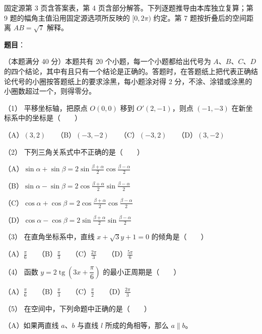 

\begin{gktip}
固定源第 3 页含答案表，第 4 页含部分解答。下列逐题推导由本库独立复算；第 9 题的幅角主值沿用固定源选项所反映的 $[0,2\pi)$ 约定。第 7 题按折叠后的空间距离 $AB=\sqrt7$ 解释。
\end{gktip}

\begin{answer}

\textbf{题目}：

（本题满分 40 分）本题共有 20 个小题，每一个小题都给出代号为 $A\text{、}B\text{、}C\text{、}D$ 的四个结论，其中有且只有一个结论是正确的。答题时，在答题纸上把代表正确结论代号的小圈按答题纸上的要求涂黑，每小题涂对得 2 分，不涂、涂错或涂黑的小圈数超过一个，则得零分。

（1） 平移坐标轴，把原点 $O(0,0)$ 移到 $O'(2,-1)$，则点 $(-1,-3)$ 在新坐标系中的坐标是\mbox{（　　）}

（A）$(3,2)$　　（B）$(-3,-2)$　　（C）$(-3,2)$　　（D）$(3,-2)$

（2） 下列三角关系式中不正确的是\mbox{（　　）}

（A）$\sin\alpha+\sin\beta=2\sin\frac{\beta+\alpha}{2}\cos\frac{\beta-\alpha}{2}$

（B）$\sin\alpha-\sin\beta=2\cos\frac{\beta+\alpha}{2}\sin\frac{\beta-\alpha}{2}$

（C）$\cos\alpha+\cos\beta=2\cos\frac{\beta+\alpha}{2}\cos\frac{\beta-\alpha}{2}$

（D）$\cos\alpha-\cos\beta=2\sin\frac{\beta+\alpha}{2}\sin\frac{\beta-\alpha}{2}$

（3） 在直角坐标系中，直线 $x+\sqrt3y+1=0$ 的倾角是\mbox{（　　）}

（A）$\frac\pi6$　　（B）$\frac\pi3$　　（C）$\frac{2\pi}3$　　（D）$\frac{5\pi}6$

（4） 函数 $y=2\operatorname{tg}\left(3x+\dfrac\pi6\right)$ 的最小正周期是\mbox{（　　）}

（A）$\frac\pi6$　　（B）$\frac\pi3$　　（C）$\frac\pi2$　　（D）$\frac{2\pi}3$

（5） 在空间中，下列命题中正确的是\mbox{（　　）}

（A）如果两直线 $a\text{、}b$ 与直线 $l$ 所成的角相等，那么 $a\parallel b$。


\end{answer}
